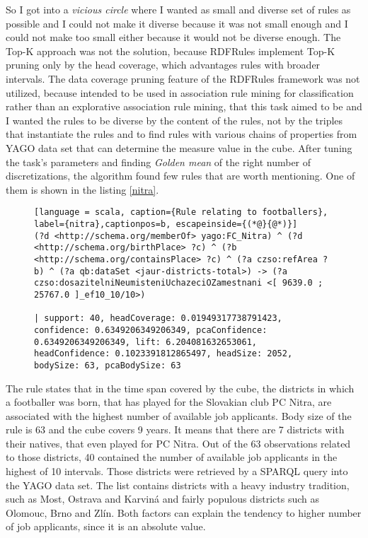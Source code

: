 So I got into a \textit{vicious circle} where I wanted as small and diverse set of rules as possible and I could not make it diverse because it was not small enough and I could not make too small either because it would not be diverse enough. The Top-K approach was not the solution, because RDFRules implement Top-K pruning only by the head coverage, which advantages rules with broader intervals. The data coverage pruning feature of the RDFRules framework was not utilized, because intended to be used in association rule mining for classification\cite{Vanhoof2010} rather than an explorative association rule mining, that this task aimed to be and I wanted the rules to be diverse by the content of the rules, not by the triples that instantiate the rules and to find rules with various chains of properties from YAGO data set that can determine the measure value in the cube. After tuning the task's parameters and finding \textit{Golden mean} of the right number of discretizations, the algorithm found few rules that are worth mentioning. One of them is shown in the listing \ref{nitra}.

\begin{figure}[h]
\begin{lstlisting}[language = scala, caption={Rule relating to footballers}, label={nitra},captionpos=b, escapeinside={(*@}{@*)}]
(?d <http://schema.org/memberOf> yago:FC_Nitra) ^ (?d <http://schema.org/birthPlace> ?c) ^ (?b <http://schema.org/containsPlace> ?c) ^ (?a czso:refArea ?b) ^ (?a qb:dataSet <jaur-districts-total>) -> (?a czso:dosazitelniNeumisteniUchazeciOZamestnani <[ 9639.0 ; 25767.0 ]_ef10_10/10>) 

| support: 40, headCoverage: 0.01949317738791423, confidence: 0.6349206349206349, pcaConfidence: 0.6349206349206349, lift: 6.204081632653061, headConfidence: 0.1023391812865497, headSize: 2052, bodySize: 63, pcaBodySize: 63
\end{lstlisting}
\end{figure}

The rule states that in the time span covered by the cube, the districts in which a footballer was born, that has played for the Slovakian club PC Nitra, are associated with the highest number of available job applicants. Body size of the rule is 63 and the cube covers 9 years. It means that there are 7 districts with their natives, that even played for PC Nitra. Out of the 63 observations related to those districts, 40 contained the number of available job applicants in the highest of 10 intervals. Those districts were retrieved by a SPARQL query into the YAGO data set. The list contains districts with a heavy industry tradition, such as Most, Ostrava and Karviná and fairly populous districts such as Olomouc, Brno and Zlín. Both factors can explain the tendency to higher number of job applicants, since it is an absolute value.